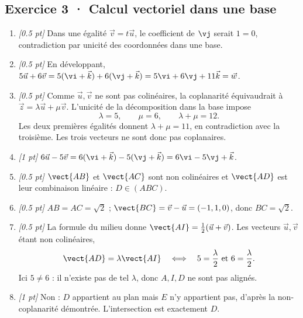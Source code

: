 \subsection*{Exercice 3 · Calcul vectoriel dans une base}\begin{enumerate}

\item \textit{[\num{0,5} pt]} Dans une égalité $\vec v=t\vec u$, le coefficient de $\vj $ serait $1=0$, contradiction par unicité des coordonnées dans une base.

\item \textit{[\num{0,5} pt]} En développant, $5\vec u+6\vec v=5(\vi +\vec k)+6(\vj +\vec k)=5\vi +6\vj +11\vec k=\vec w$.

\item \textit{[\num{0,5} pt]} Comme $\vec u,\vec v$ ne sont pas colinéaires, la coplanarité équivaudrait à $\vec z=\lambda\vec u+\mu\vec v$. L'unicité de la décomposition dans la base impose
\[\lambda=5,\qquad\mu=6,\qquad\lambda+\mu=12.\]
Les deux premières égalités donnent $\lambda+\mu=11$, en contradiction avec la troisième. Les trois vecteurs ne sont donc pas coplanaires.

\item \textit{[1 pt]} $6\vec u-5\vec v=6(\vi +\vec k)-5(\vj +\vec k)=6\vi -5\vj +\vec k$.

\item \textit{[\num{0,5} pt]} $\vect{AB}$ et $\vect{AC}$ sont non colinéaires et $\vect{AD}$ est leur combinaison linéaire : $D\in(ABC)$.

\item \textit{[\num{0,5} pt]} $AB=AC=\sqrt2$ ; $\vect{BC}=\vec v-\vec u=(-1,1,0)$, donc $BC=\sqrt2$.

\item \textit{[\num{0,5} pt]} La formule du milieu donne $\vect{AI}=\frac12(\vec u+\vec v)$. Les vecteurs $\vec u,\vec v$ étant non colinéaires,
\[\vect{AD}=\lambda\vect{AI}\quad\Longleftrightarrow\quad 5=\frac{\lambda}{2}\ \text{et}\ 6=\frac{\lambda}{2}.\]
Ici $5\ne 6$ : il n'existe pas de tel $\lambda$, donc $A,I,D$ ne sont pas alignés.

\item \textit{[1 pt]} Non : $D$ appartient au plan mais $E$ n'y appartient pas, d'après la non-coplanarité démontrée. L'intersection est exactement $D$.

\end{enumerate}

